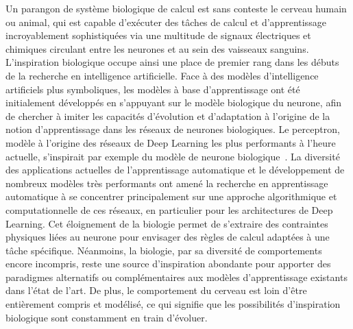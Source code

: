 Un parangon de système biologique de calcul est sans conteste le cerveau humain ou animal, qui est capable d'exécuter des tâches de calcul et d'apprentissage incroyablement sophistiquées via une multitude de signaux électriques et chimiques circulant entre les neurones et au sein des vaisseaux sanguins.
L'inspiration biologique occupe ainsi une place de premier rang dans les débuts de la recherche en intelligence artificielle.
Face à des modèles d'intelligence artificiels plus symboliques, les modèles à base d'apprentissage ont été initialement développés en s'appuyant sur le modèle biologique du neurone, afin de chercher à imiter les capacités d'évolution et d'adaptation à l'origine de la notion d'apprentissage dans les réseaux de neurones biologiques.
Le perceptron, modèle à l'origine des réseaux de Deep Learning les plus performants à l'heure actuelle, s'inspirait par exemple du modèle de neurone biologique~\cite{McCulloch1990ALC}.
La diversité des applications actuelles de l'apprentissage automatique et le développement de nombreux modèles très performants ont amené la recherche en apprentissage automatique à se concentrer principalement sur une approche algorithmique et computationnelle de ces réseaux, en particulier pour les architectures de Deep Learning. 
Cet éloignement de la biologie permet de s'extraire des contraintes physiques liées au neurone pour envisager des règles de calcul adaptées à une tâche spécifique.
Néanmoins, la biologie, par sa diversité de comportements encore incompris, reste une source d'inspiration abondante pour apporter des paradigmes alternatifs ou complémentaires aux modèles d'apprentissage existants dans l'état de l'art. De plus, le comportement du cerveau est loin d'être entièrement compris et modélisé, ce qui signifie que les possibilités d'inspiration biologique sont constamment en train d'évoluer.
